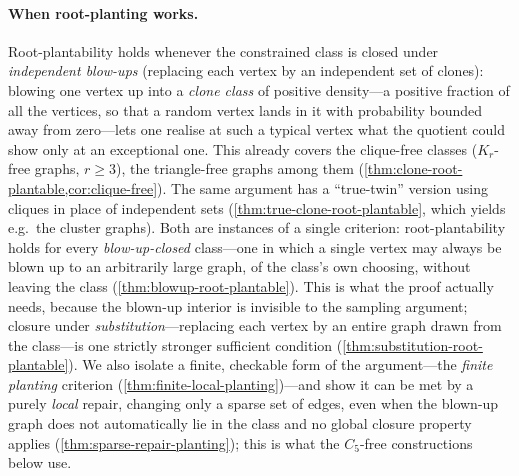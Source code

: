 \documentclass[11pt]{article}
\theoremstyle{definition}
\begin{document}
\paragraph{When root-planting works.}
Root-plantability holds whenever the constrained class is closed under
\emph{independent blow-ups}
(replacing each vertex by an independent set of clones): blowing one vertex up into a
\emph{clone class} of positive density---a positive fraction of all the vertices, so that a
random vertex lands in it with probability bounded away from zero---lets one realise at
such a typical vertex what the quotient could show only at an exceptional one.
This already covers the clique-free classes ($K_r$-free graphs, $r\ge3$), the
triangle-free graphs among them
(\cref{thm:clone-root-plantable,cor:clique-free}).  The same argument has a
``true-twin'' version using cliques in place of independent sets
(\cref{thm:true-clone-root-plantable}, which yields e.g.\ the cluster graphs).  Both are
instances of a single criterion: root-plantability holds for every \emph{blow-up-closed}
class---one in which a single vertex may always be blown up to an arbitrarily large graph,
of the class's own choosing, without leaving the class (\cref{thm:blowup-root-plantable}).
This is what the proof actually needs, because the blown-up interior is invisible to the
sampling argument; closure under \emph{substitution}---replacing each vertex by an entire
graph drawn from the class---is one strictly stronger sufficient condition
(\cref{thm:substitution-root-plantable}).  We also isolate a finite, checkable form of the
argument---the \emph{finite planting} criterion (\cref{thm:finite-local-planting})---and show
it can be met by a purely \emph{local} repair, changing only a sparse set of edges, even when
the blown-up graph does not automatically lie in the class and no global closure property
applies (\cref{thm:sparse-repair-planting}); this is what the $C_5$-free constructions below
use.
\end{document}

